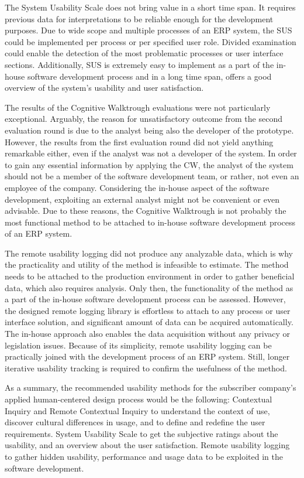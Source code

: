 \documentclass[12pt,a4paper,oneside,pdftex]{report}
\begin{document}
The System Usability Scale does not bring value in a short time span. It requires previous data for interpretations to be reliable enough for the development purposes. Due to wide scope and multiple processes of an ERP system, the SUS could be implemented per process or per specified user role. Divided examination could enable the detection of the most problematic processes or user interface sections. Additionally, SUS is extremely easy to implement as a part of the in-house software development process and in a long time span, offers a good overview of the system's usability and user satisfaction. 

The results of the Cognitive Walktrough evaluations were not particularly exceptional. Arguably, the reason for unsatisfactory outcome from the second evaluation round is due to the analyst being also the developer of the prototype. However, the results from the first evaluation round did not yield anything remarkable either, even if the analyst was not a developer of the system. In order to gain any essential information by applying the CW, the analyst of the system should not be a member of the software development team, or rather, not even an employee of the company. Considering the in-house aspect of the software development, exploiting an external analyst might not be convenient or even advisable. Due to these reasons, the Cognitive Walktrough is not probably the most functional method to be attached to in-house software development process of an ERP system. 

The remote usability logging did not produce any analyzable data, which is why the practicality and utility of the method is infeasible to estimate. The method needs to be attached to the production environment in order to gather beneficial data, which also requires analysis. Only then, the functionality of the method as a part of the in-house software development process can  be assessed. However, the designed remote logging library is effortless to attach to any process or user interface solution, and significant amount of data can be acquired automatically. The in-house approach also enables the data acquisition without any privacy or legislation issues. Because of its simplicity, remote usability logging can be practically joined with the development process of an  ERP system. Still, longer iterative usability tracking is required to confirm the usefulness of the method.

As a summary, the recommended usability methods for the subscriber company's applied human-centered design process would be the following: Contextual Inquiry and Remote Contextual Inquiry to understand the context of use, discover cultural differences in usage, and to define and redefine the user requirements. System Usability Scale to get the subjective ratings about the usability, and an overview about the user satisfaction. Remote usability logging to gather hidden usability, performance and usage data to be exploited in the software development. 
\end{document}
